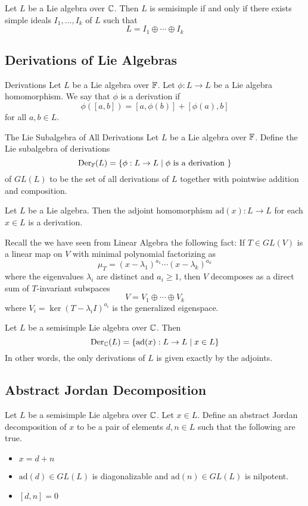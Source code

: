 \documentclass[a4paper]{article}
\begin{document}
\begin{thm}{}{} Let $L$ be a Lie algebra over $\mathbb{C}$. Then $L$ is semisimple if and only if there exists simple ideals $I_1,\dots,I_k$ of $L$ such that $$L=I_1\oplus\cdots\oplus I_k$$
\end{thm}

\subsection{Derivations of Lie Algebras}
\begin{defn}{Derivations}{} Let $L$ be a Lie algebra over $\mathbb{F}$. Let $\phi:L\to L$ be a Lie algebra homomorphism. We say that $\phi$ is a derivation if $$\phi([a,b])=[a,\phi(b)]+[\phi(a),b]$$ for all $a,b\in L$. 
\end{defn}

\begin{defn}{The Lie Subalgebra of All Derivations}{} Let $L$ be a Lie algebra over $\mathbb{F}$. Define the Lie subalgebra of derivations $$\text{Der}_{\mathbb{F}}(L)=\{\phi:L\to L\;|\;\phi\text{ is a derivation }\}$$ of $GL(L)$ to be the set of all derivations of $L$ together with pointwise addition and composition. 
\end{defn}

\begin{lmm}{}{} Let $L$ be a Lie algebra. Then the adjoint homomorphism $\text{ad}(x):L\to L$ for each $x\in L$ is a derivation. 
\end{lmm}

Recall the we have seen from Linear Algebra the following fact: If $T\in GL(V)$ is a linear map on $V$ with minimal polynomial factorizing as $$\mu_T=(x-\lambda_1)^{a_1}\cdots(x-\lambda_k)^{a_k}$$ where the eigenvalues $\lambda_i$ are distinct and $a_i\geq 1$, then $V$ decomposes as a direct sum of $T$-invariant subspaces $$V=V_1\oplus\cdots\oplus V_k$$ where $V_i=\ker(T-\lambda_i I)^{a_i}$ is the generalized eigenspace. 

\begin{prp}{}{} Let $L$ be a semisimple Lie algebra over $\mathbb{C}$. Then $$\text{Der}_{\mathbb{C}}(L)=\{\text{ad}(x):L\to L\;|\;x\in L\}$$ In other words, the only derivations of $L$ is given exactly by the adjoints. 
\end{prp}

\subsection{Abstract Jordan Decomposition}
\begin{defn}{}{} Let $L$ be a semisimple Lie algebra over $\mathbb{C}$. Let $x\in L$. Define an abstract Jordan decomposition of $x$ to be a pair of elements $d,n\in L$ such that the following are true. 
\begin{itemize}
\item $x=d+n$
\item $\text{ad}(d)\in GL(L)$ is diagonalizable and $\text{ad}(n)\in GL(L)$ is nilpotent. 
\item $[d,n]=0$
\end{itemize}
\end{defn}
\end{document}
